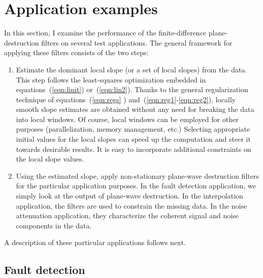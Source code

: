 \section{Application examples}

In this section, I examine the performance of the finite-difference
plane-destruction filters on several test applications. The general
framework for applying these filters consists of the two steps:
\begin{enumerate}
\item Estimate the dominant local slope (or a set of local slopes)
  from the data. This step follows the least-squares optimization
  embedded in equations~(\ref{eqn:linit}) or~(\ref{eqn:lin2}). Thanks
  to the general regularization technique of
  equations~(\ref{eqn:regs} ) and~(\ref{eqn:reg1}-\ref{eqn:reg2}),
  locally smooth slope estimates are obtained without any need for
  breaking the data into local windows. Of course, local windows can
  be employed for other purposes (parallelization, memory management,
  etc.) Selecting appropriate initial values for the local slopes can
  speed up the computation and steer it towards desirable results.
  It is easy to incorporate additional constraints on the local 
  slope values.
\item Using the estimated slope, apply non-stationary plane-wave
  destruction filters for the particular application purposes. In the
  fault detection application, we simply look at the output of
  plane-wave destruction.  In the interpolation application, the
  filters are used to constrain the missing data. In the noise
  attenuation application, they characterize the coherent 
  signal and noise components in the data.
\end{enumerate}
A description of these particular applications follows next.

\subsection{Fault detection}


